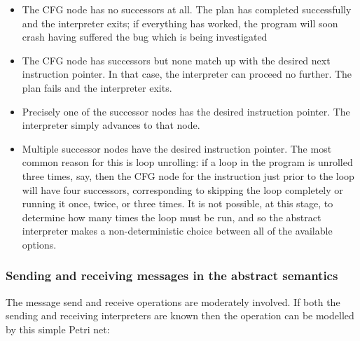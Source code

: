 \begin{itemize}
  \begin{itemize}
  \item
    The CFG node has no successors at all.  The plan has completed
    successfully and the interpreter exits; if everything has worked,
    the program will soon crash having suffered the bug which is being
    investigated
  \item
    The CFG node has successors but none match up with the desired
    next instruction pointer.  In that case, the interpreter can
    proceed no further.  The plan fails and the interpreter exits.
  \item
    Precisely one of the successor nodes has the desired instruction
    pointer.  The interpreter simply advances to that node.
  \item
    Multiple successor nodes have the desired instruction pointer.
    The most common reason for this is loop unrolling: if a loop in
    the program is unrolled three times, say, then the CFG node for
    the instruction just prior to the loop will have four successors,
    corresponding to skipping the loop completely or running it once,
    twice, or three times.  It is not possible, at this stage, to
    determine how many times the loop must be run, and so the abstract
    interpreter makes a non-deterministic choice between all of the
    available options.
  \end{itemize}
\end{itemize}

\subsubsection{Sending and receiving messages in the abstract semantics}

The message send and receive operations are moderately involved.  If
both the sending and receiving interpreters are known then the
operation can be modelled by this simple Petri net:


